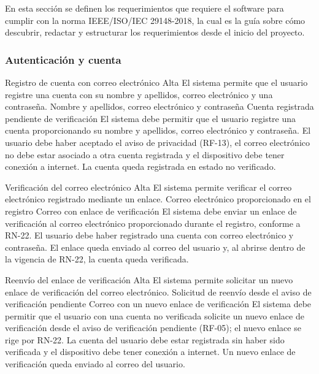 En esta sección se definen los requerimientos que requiere el software para cumplir con la norma IEEE/ISO/IEC 29148-2018\cite{iso29148}, la cual es la guía sobre cómo descubrir, redactar y estructurar los requerimientos desde el inicio del proyecto.

\subsubsection{Autenticación y cuenta}

  {Registro de cuenta con correo electrónico}%
  {Alta}%
  {El sistema permite que el usuario registre una cuenta con su nombre y apellidos, correo electrónico y una contraseña.}%
  {Nombre y apellidos, correo electrónico y contraseña}%
  {Cuenta registrada pendiente de verificación}%
  {El sistema debe permitir que el usuario registre una cuenta proporcionando su nombre y apellidos, correo electrónico y contraseña.}%
  {El usuario debe haber aceptado el aviso de privacidad (RF-13), el correo electrónico no debe estar asociado a otra cuenta registrada y el dispositivo debe tener conexión a internet.}%
  {La cuenta queda registrada en estado no verificado.}%
  
  {Verificación del correo electrónico}%
  {Alta}%
  {El sistema permite verificar el correo electrónico registrado mediante un enlace.}%
  {Correo electrónico proporcionado en el registro}%
  {Correo con enlace de verificación}%
  {El sistema debe enviar un enlace de verificación al correo electrónico proporcionado durante el registro, conforme a RN-22.}%
  {El usuario debe haber registrado una cuenta con correo electrónico y contraseña.}%
  {El enlace queda enviado al correo del usuario y, al abrirse dentro de la vigencia de RN-22, la cuenta queda verificada.}%

  {Reenvío del enlace de verificación}%
  {Alta}%
  {El sistema permite solicitar un nuevo enlace de verificación del correo electrónico.}%
  {Solicitud de reenvío desde el aviso de verificación pendiente}%
  {Correo con un nuevo enlace de verificación}%
  {El sistema debe permitir que el usuario con una cuenta no verificada solicite un nuevo enlace de verificación desde el aviso de verificación pendiente (RF-05); el nuevo enlace se rige por RN-22.}%
  {La cuenta del usuario debe estar registrada sin haber sido verificada y el dispositivo debe tener conexión a internet.}%
  {Un nuevo enlace de verificación queda enviado al correo del usuario.}%

